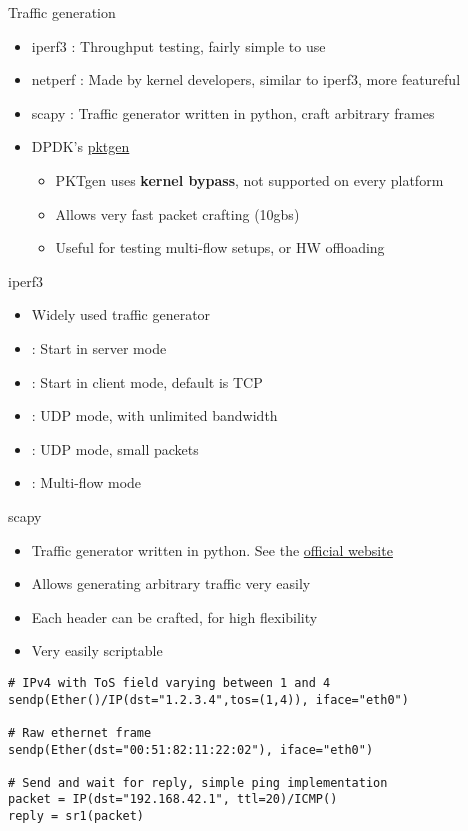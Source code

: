\begin{frame}{Traffic generation}
	\begin{itemize}
		\item iperf3 : Throughput testing, fairly simple to use
		\item netperf : Made by kernel developers, similar to iperf3, more featureful
		\item scapy : Traffic generator written in python, craft arbitrary frames
		\item DPDK's \href{https://pktgen-dpdk.readthedocs.io/en/latest/}{pktgen}
			\begin{itemize}
				\item PKTgen uses \textbf{kernel bypass}, not supported on every platform
				\item Allows very fast packet crafting (10gbs)
				\item Useful for testing multi-flow setups, or HW offloading
			\end{itemize}
	\end{itemize}
\end{frame}

\begin{frame}{iperf3}
	\begin{itemize}
		\item Widely used traffic generator
		\item {} : Start in server mode
		\item {} : Start in client mode, default is TCP
		\item {} : UDP mode, with unlimited bandwidth
		\item {} : UDP mode, small packets
		\item {} : Multi-flow mode
	\end{itemize}
\end{frame}

\begin{frame}[fragile]{scapy}
	\begin{itemize}
		\item Traffic generator written in python. See the \href{https://scapy.net/}{official website}
		\item Allows generating arbitrary traffic very easily
		\item Each header can be crafted, for high flexibility
		\item Very easily scriptable
	\end{itemize}
	\begin{verbatim}
# IPv4 with ToS field varying between 1 and 4
sendp(Ether()/IP(dst="1.2.3.4",tos=(1,4)), iface="eth0")

# Raw ethernet frame
sendp(Ether(dst="00:51:82:11:22:02"), iface="eth0") 

# Send and wait for reply, simple ping implementation
packet = IP(dst="192.168.42.1", ttl=20)/ICMP()
reply = sr1(packet) 	\end{verbatim}
\end{frame}

